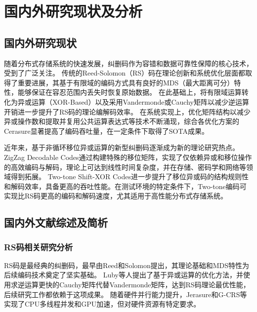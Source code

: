 
\chapter{国内外研究现状及分析}

\section{国内外研究现状}

随着分布式存储系统的快速发展，纠删码作为容错和数据可靠性保障的核心技术，受到了广泛关注。
传统的Reed-Solomon（RS）码\cite{reedPolynomialCodesCertain1960}在理论创新和系统优化层面都取得了重要进展，其基于有限域的编码方式具有良好的MDS（最大距离可分）特性，能够保证在容忍范围内丢失时恢复原始数据。
在此基础上，将有限域运算转化为异或运算（XOR-Based）以及采用Vandermonde或Cauchy矩阵以减少逆运算开销进一步提升了RS码的理论编解码效率\cite{lubyXORBasedErasureResilientCoding1995}。
在系统实现上，优化矩阵结构以减少异或操作数和提取并复用公共运算表达式等技术不断涌现，综合各优化方案的Cerasure\cite{wangFastAccelerationStrategies2025}显著提高了编码吞吐量，在一定条件下取得了SOTA成果。

近年来，基于非循环移位异或运算的新型纠删码逐渐成为新的理论研究热点。
ZigZag Decodable Codes\cite{gongZigzagDecodableCodes2017}通过构建特殊的移位矩阵，实现了仅依赖异或和移位操作的高效编码与解码，理论上可达到线性时间复杂度，并在存储、密码学和网络等领域得到拓展。
Two-tone Shift-XOR Codes\cite{fuTwotoneShiftXORStorage2021}进一步提升了移位异或码的结构规则性和解码效率，具备更高的吞吐性能。在测试环境的特定条件下，Two-tone编码可实现比RS码更高的编码和解码速度，尤其适用于高性能分布式存储系统。

\section{国内外文献综述及简析}

\subsection{RS码相关研究分析}

RS码是最经典的纠删码，最早由Reed和Solomon提出\cite{reedPolynomialCodesCertain1960}，其理论基础和MDS特性为后续编码技术奠定了坚实基础。
Luby等人提出了基于异或运算的优化方法\cite{lubyXORBasedErasureResilientCoding1995}，并使用求逆运算更快的Cauchy矩阵代替Vandermonde矩阵，达到RS码理论最优性能，后续研究工作都依赖于这项成果。
随着硬件并行能力提升，Jerasure\cite{plankJerasureLibraryFacilitating2008, arslanOpenMPPOSIXThreads2017}和G-CRS\cite{liuGCRSGPUAccelerated2018}等实现了CPU多线程并发和GPU加速，但对硬件资源有特定要求。

